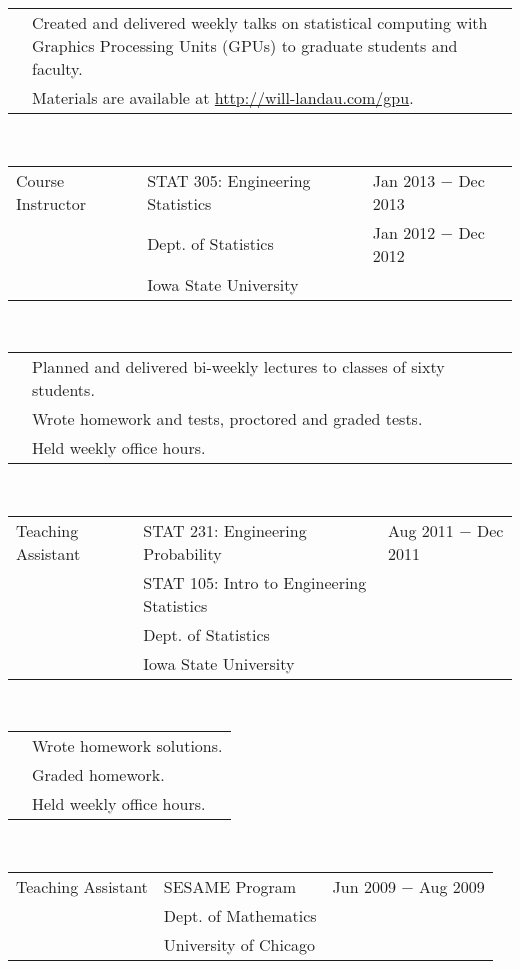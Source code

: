 \documentclass{article}
\newcommand{\q}{$\quad$ \newline}
\newcommand{\vl}{4.25}
\newcommand{\wl}{8.4}
\newcommand{\ww}{13}
\begin{document}
 \noindent \begin{tabular}{@{}p{\vl cm}p{\ww cm}@{}}
& Created and delivered weekly talks on statistical computing with Graphics Processing Units (GPUs) to graduate students and faculty. \\
& Materials are available at \href{http://will-landau.com/gpu}{http://will-landau.com/gpu}.
\end{tabular} \q \q  


\noindent \begin{tabular}{@{}p{\vl cm}p{\wl cm}l@{}}
Course Instructor & STAT 305: Engineering Statistics & Jan 2013 $-$ Dec 2013 \\
& Dept. of Statistics & Jan 2012 $-$ Dec 2012 \\
& Iowa State University & 
\end{tabular} \q \q

\noindent \begin{tabular}{@{}p{\vl cm}p{\ww cm}@{}}
& Planned and delivered bi-weekly lectures to classes of sixty students. \\
& Wrote homework and tests, proctored and graded tests. \\
& Held weekly office hours. \\
\end{tabular} \q \q  

\noindent \begin{tabular}{@{}p{\vl cm}p{\wl cm}l@{}}
Teaching Assistant & STAT 231: Engineering Probability & Aug 2011 $-$ Dec 2011 \\
& STAT 105: Intro to Engineering Statistics & \\
& Dept. of Statistics & \\
& Iowa State University & \\
\end{tabular} \q \q

\noindent \begin{tabular}{@{}p{\vl cm}p{\ww cm}@{}}
& Wrote homework solutions. \\
& Graded homework. \\
& Held weekly office hours.
\end{tabular} \q \q  

\noindent \begin{tabular}{@{}p{\vl cm}p{\wl cm}l@{}}
Teaching Assistant & SESAME Program & Jun 2009 $-$ Aug 2009 \\
& Dept. of Mathematics & \\
& University of Chicago &
\end{tabular} \q \q
\end{document}
